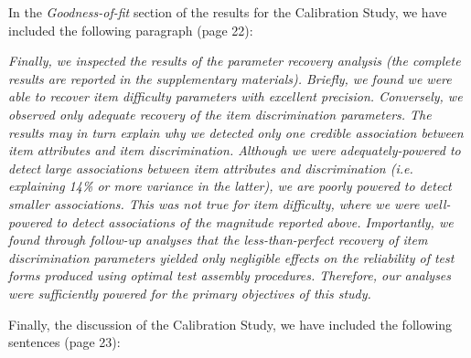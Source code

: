 \documentclass[a4paper,notitlepage,12pt]{article}
\begin{document}
In the \textit{Goodness-of-fit} section of the results for the Calibration Study, we have included the following paragraph (page 22):

\begin{displayquote}
\textit{Finally, we inspected the results of the parameter recovery analysis (the complete results are reported in the supplementary materials). Briefly, we found we were able to recover item difficulty parameters with excellent precision. Conversely, we observed only adequate recovery of the item discrimination parameters. The results may in turn explain why we detected only one credible association between item attributes and item discrimination. Although we were adequately-powered to detect large associations between item attributes and discrimination (i.e. explaining 14\% or more variance in the latter), we are poorly powered to detect smaller associations. This was not true for item difficulty, where we were well-powered to detect associations of the magnitude reported above. Importantly, we found through follow-up analyses that the less-than-perfect recovery of item discrimination parameters yielded only negligible effects on the reliability of test forms produced using optimal test assembly procedures. Therefore, our analyses were sufficiently powered for the primary objectives of this study.}
\end{displayquote}

Finally, the discussion of the Calibration Study, we have included the following sentences (page 23):
\end{document}
